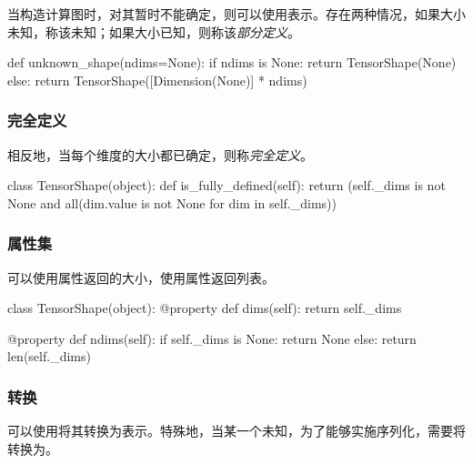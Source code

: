 \begin{content}
当构造计算图时，对其暂时不能确定，则可以使用表示。存在两种情况，如果大小未知，称该未知；如果大小已知，则称该\emph{部分定义}。

\begin{leftbar}
\begin{python}
def unknown_shape(ndims=None):
  if ndims is None:
    return TensorShape(None)
  else:
    return TensorShape([Dimension(None)] * ndims)
\end{python}
\end{leftbar}

\subsubsection{完全定义}

相反地，当每个维度的大小都已确定，则称\emph{完全定义}。

\begin{leftbar}
\begin{python}
class TensorShape(object):
  def is_fully_defined(self):
    return (self._dims is not None and all(dim.value is not None
                                           for dim in self._dims))
\end{python}
\end{leftbar}

\subsubsection{属性集}

可以使用属性返回的大小，使用属性返回列表。

\begin{leftbar}
\begin{python}
class TensorShape(object):
  @property
  def dims(self):
    return self._dims

  @property
  def ndims(self):
    if self._dims is None:
      return None
    else:
      return len(self._dims)
\end{python}
\end{leftbar}

\subsubsection{转换}

可以使用将其转换为表示。特殊地，当某一个未知，为了能够实施序列化，需要将转换为。


\end{content}
